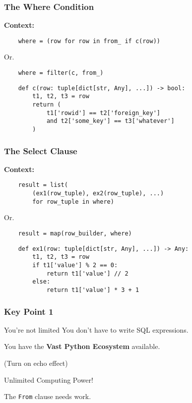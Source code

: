 \documentclass{beamer}
\begin{document}
\begin{frame}[fragile]
    \frametitle{The Where Condition}
    \textbf{Context:}

    \begin{verbatim}
    where = (row for row in from_ if c(row))
    \end{verbatim}

    Or.

    \begin{verbatim}
    where = filter(c, from_)
    \end{verbatim}


    \vspace{1em}
    \begin{verbatim}
    def c(row: tuple[dict[str, Any], ...]) -> bool:
        t1, t2, t3 = row
        return (
            t1['rowid'] == t2['foreign_key']
            and t2['some_key'] == t3['whatever']
        )
    \end{verbatim}


\end{frame}

\begin{frame}[fragile]
    \frametitle{The Select Clause}
    \textbf{Context:}

    \begin{verbatim}
    result = list(
        (ex1(row_tuple), ex2(row_tuple), ...)
        for row_tuple in where)
    \end{verbatim}

    Or.

    \begin{verbatim}
    result = map(row_builder, where)
    \end{verbatim}

    \vspace{1em}
    \begin{verbatim}
    def ex1(row: tuple[dict[str, Any], ...]) -> Any:
        t1, t2, t3 = row
        if t1['value'] % 2 == 0:
            return t1['value'] // 2
        else:
            return t1['value'] * 3 + 1
    \end{verbatim}

\end{frame}

\begin{frame}
    \frametitle{Key Point 1}

    \begin{block}{You're not limited}
        You don't have to write SQL expressions.

        \vspace{1em}
        You have the \textbf{Vast Python Ecosystem} available.
        \pause

        \vspace{1em}
        (Turn on echo effect)

        \Large{Unlimited Computing Power!}
    \end{block}
    \pause

    \vspace{1em}

    The \texttt{From} clause needs work.
\end{frame}
\end{document}
